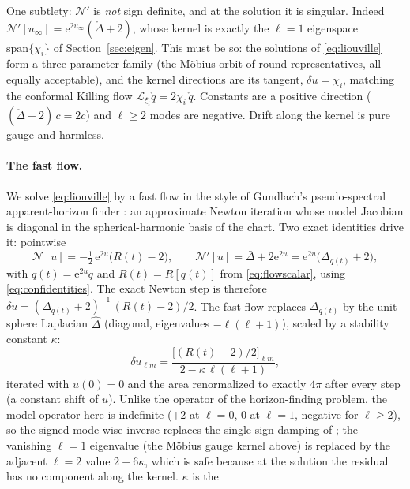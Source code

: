 \documentclass[11pt]{article}
\newcommand{\ee}{\mathrm{e}}
\newcommand{\Lie}{\mathcal{L}}
\newcommand{\qo}{\mathring{q}}          %
\newcommand{\Lapo}{\mathring{\Delta}}   %
\begin{document}
One subtlety: $\mathcal{N}'$ is \emph{not} sign definite, and at the
solution it is singular.  Indeed
$\mathcal{N}'[u_\infty] = \ee^{2u_\infty}(\Lapo + 2)$, whose kernel is
exactly the $\ell=1$ eigenspace $\mathrm{span}\{\chi_i\}$ of
Section~\ref{sec:eigen}.  This must be so: the solutions of
\eqref{eq:liouville} form a three-parameter family (the M\"obius orbit of
round representatives, all equally acceptable), and the kernel directions
are its tangent, $\delta u = \chi_i$, matching the conformal Killing flow
$\Lie_{\xi_i}\qo = 2\chi_i\,\qo$.  Constants are a positive direction
($(\Lapo+2)\,c = 2c$) and $\ell\ge2$ modes are negative.  Drift along the
kernel is pure gauge and harmless.

\paragraph{The fast flow.}
We solve \eqref{eq:liouville} by a fast flow in the style of Gundlach's
pseudo-spectral apparent-horizon finder \cite{gundlach1997}: an approximate
Newton iteration whose model Jacobian is diagonal in the spherical-harmonic
basis of the chart.  Two exact identities drive it: pointwise
\begin{equation*}
  \mathcal{N}[u] = -\tfrac12\,\ee^{2u}\bigl(R(t)-2\bigr),
  \qquad
  \mathcal{N}'[u] = \bar\Delta + 2\ee^{2u}
                  = \ee^{2u}\bigl(\Delta_{q(t)} + 2\bigr),
\end{equation*}
with $q(t) = \ee^{2u}\bar q$ and $R(t) = R[q(t)]$ from \eqref{eq:flowscalar},
using \eqref{eq:confidentities}.  The exact Newton step is therefore
$\delta u = (\Delta_{q(t)}+2)^{-1}\,(R(t)-2)/2$.  The fast flow replaces
$\Delta_{q(t)}$ by the unit-sphere Laplacian $\hat\Delta$ (diagonal,
eigenvalues $-\ell(\ell+1)$), scaled by a stability constant $\kappa$:
\begin{equation*}
  \delta u_{\ell m}
    = \frac{\bigl[(R(t)-2)/2\bigr]_{\ell m}}{2 - \kappa\,\ell(\ell+1)} ,
\end{equation*}
iterated with $u(0) = 0$ and the area renormalized to exactly $4\pi$ after
every step (a constant shift of $u$).  Unlike the operator of the
horizon-finding problem, the model operator here is indefinite ($+2$ at
$\ell=0$, $0$ at $\ell=1$, negative for $\ell\ge2$), so the signed mode-wise
inverse replaces the single-sign damping of \cite{gundlach1997}; the
vanishing $\ell=1$ eigenvalue (the M\"obius gauge kernel above) is replaced
by the adjacent $\ell=2$ value $2-6\kappa$, which is safe because at the
solution the residual has no component along the kernel.  $\kappa$ is the
\end{document}
